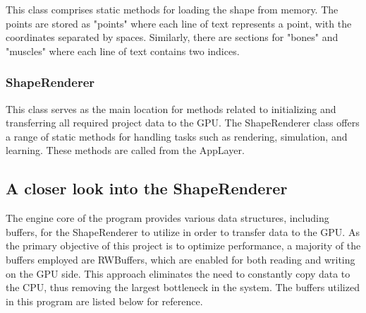         This class comprises static methods for loading the shape from memory. The points are stored as "points" where each line of text represents a point, with the coordinates separated by spaces. Similarly, there are sections for "bones" and "muscles" where each line of text contains two indices.

    \hfill

    \subsubsection{\textbf{\large ShapeRenderer}}

        This class serves as the main location for methods related to initializing and transferring all required project data to the GPU. The ShapeRenderer class offers a range of static methods for handling tasks such as rendering, simulation, and learning. These methods are called from the AppLayer.

\subsection{\LARGE A closer look into the ShapeRenderer}

        The engine core of the program provides various data structures, including buffers, for the ShapeRenderer to utilize in order to transfer data to the GPU. As the primary objective of this project is to optimize performance, a majority of the buffers employed are RWBuffers, which are enabled for both reading and writing on the GPU side. This approach eliminates the need to constantly copy data to the CPU, thus removing the largest bottleneck in the system. The buffers utilized in this program are listed below for reference.

